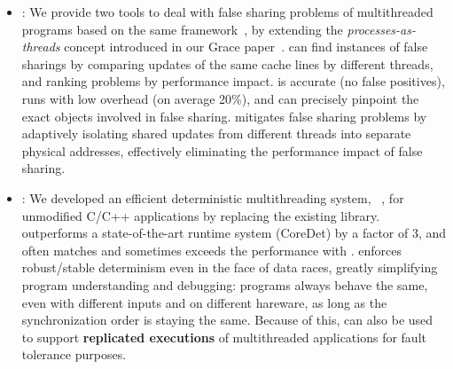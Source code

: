 \begin{itemize}
\item \Sheriff{}:
We provide two tools to deal with false sharing problems
of multithreaded programs based on the same \Sheriff{} framework~\cite{sheriff}, 
by extending the \emph{processes-as-threads} concept introduced
in our Grace paper~\cite{grace}.
\SheriffDetect{} can find instances of false sharings by comparing updates of
the same cache lines by different threads, and ranking problems by performance impact. 
\SheriffDetect{} is accurate (no false positives), runs with low overhead (on average 20\%), and can precisely pinpoint the exact objects involved in false sharing.
\SheriffProtect{} mitigates false sharing problems by adaptively isolating shared 
updates from different threads into separate physical addresses, effectively 
eliminating the performance impact of false sharing. 


\item \Dthreads{}:
We developed an efficient deterministic multithreading system, \dthreads{}~\cite{dthreads}, 
for unmodified C/C++ applications by replacing the existing \pthreads{} library.
\dthreads{} outperforms a state-of-the-art runtime system (CoreDet)
by a factor of 3, and often matches and sometimes exceeds the performance with \pthreads{}.
\Dthreads{} enforces robust/stable determinism even in the face of data races, 
greatly simplifying program understanding and debugging: 
programs always behave the same, even with different inputs and on different hareware,
as long as the synchronization order is staying the same. 
Because of this, \dthreads{} can also be used to support \textbf{replicated executions} 
of multithreaded applications for fault tolerance purposes.


\end{itemize}
